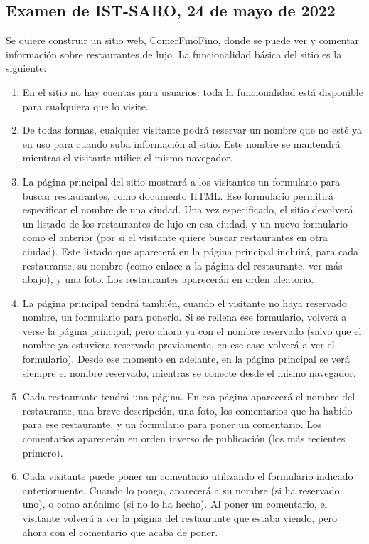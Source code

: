 \subsection{Examen de IST-SARO, 24 de mayo de 2022}

Se quiere construir un sitio web, ComerFinoFino, donde se puede ver y comentar información sobre restaurantes de lujo. La funcionalidad básica del sitio es la siguiente:

\begin{enumerate}
\item En el sitio no hay cuentas para usuarios: toda la funcionalidad está disponible para cualquiera que lo visite.
\item De todas formas, cualquier visitante podrá reservar un nombre que no esté ya en uso para cuando suba información al sitio. Este nombre se mantendrá mientras el visitante utilice el mismo navegador.
\item La página principal del sitio mostrará a los visitantes un formulario para buscar restaurantes, como documento HTML. Ese formulario permitirá especificar el nombre de una ciudad. Una vez especificado, el sitio devolverá un listado de los restaurantes de lujo en esa ciudad, y un nuevo formulario como el anterior (por si el visitante quiere buscar restaurantes en otra ciudad). Este listado que aparecerá en la página principal incluirá, para cada restaurante, su nombre (como enlace a la página del restaurante, ver más abajo), y una foto. Los restaurantes aparecerán en orden aleatorio.
\item La página principal tendrá también, cuando el visitante no haya reservado nombre, un formulario para ponerlo. Si se rellena ese formulario, volverá a verse la página principal, pero ahora ya con el nombre reservado (salvo que el nombre ya estuviera reservado previamente, en ese caso volverá a ver el formulario). Desde ese momento en adelante, en la página principal se verá siempre el nombre reservado, mientras se conecte desde el mismo navegador.
\item Cada restaurante tendrá una página. En esa página aparecerá el nombre del restaurante, una breve descripción, una foto, los comentarios que ha habido para ese restaurante, y un formulario para poner un comentario. Los comentarios aparecerán en orden inverso de publicación (los más recientes primero).
\item Cada visitante puede poner un comentario utilizando el formulario indicado anteriormente. Cuando lo ponga, aparecerá a su nombre (si ha reservado uno), o como anónimo (si no lo ha hecho). Al poner un comentario, el visitante volverá a ver la página del restaurante que estaba viendo, pero ahora con el comentario que acaba de poner.

\end{enumerate}
